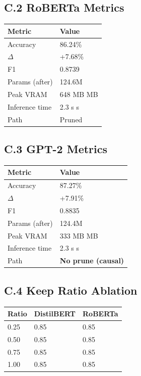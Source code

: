 \subsection{C.2 RoBERTa Metrics}

\begin{table}[H]
\centering
\small
\begin{tabular}{ll}
\toprule
\textbf{Metric} & \textbf{Value} \\
\midrule
Accuracy & 86.24\% \\
$\Delta$ & +7.68\% \\
F1 & 0.8739 \\
Params (after) & 124.6M \\
Peak VRAM & 648 MB MB \\
Inference time & 2.3 s s \\
Path & Pruned \\
\bottomrule
\end{tabular}
\end{table}

\subsection{C.3 GPT-2 Metrics}

\begin{table}[H]
\centering
\small
\begin{tabular}{ll}
\toprule
\textbf{Metric} & \textbf{Value} \\
\midrule
Accuracy & 87.27\% \\
$\Delta$ & +7.91\% \\
F1 & 0.8835 \\
Params (after) & 124.4M \\
Peak VRAM & 333 MB MB \\
Inference time & 2.3 s s \\
Path & \textbf{No prune (causal)} \\
\bottomrule
\end{tabular}
\end{table}

\subsection{C.4 Keep Ratio Ablation}

\begin{table}[H]
\centering
\small
\begin{tabular}{lll}
\toprule
\textbf{Ratio} & \textbf{DistilBERT} & \textbf{RoBERTa} \\
\midrule
0.25 & 0.85 & 0.85 \\
0.50 & 0.85 & 0.85 \\
0.75 & 0.85 & 0.85 \\
1.00 & 0.85 & 0.85 \\
\bottomrule
\end{tabular}
\end{table}

